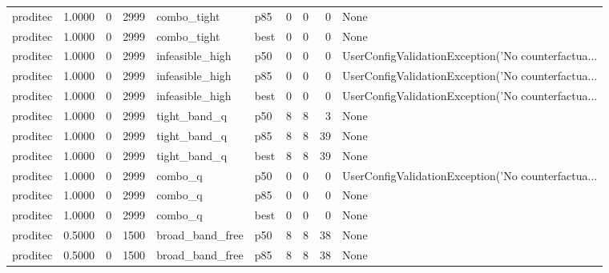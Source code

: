 \begin{tabular}{lrrrllrrrl}
proditec &    1.0000 &    0 &   2999 &          combo\_tight &    p85 &               0 &          0 &       0 &                                               None \\
proditec &    1.0000 &    0 &   2999 &          combo\_tight &   best &               0 &          0 &       0 &                                               None \\
proditec &    1.0000 &    0 &   2999 &      infeasible\_high &    p50 &               0 &          0 &       0 & UserConfigValidationException('No counterfactua... \\
proditec &    1.0000 &    0 &   2999 &      infeasible\_high &    p85 &               0 &          0 &       0 & UserConfigValidationException('No counterfactua... \\
proditec &    1.0000 &    0 &   2999 &      infeasible\_high &   best &               0 &          0 &       0 & UserConfigValidationException('No counterfactua... \\
proditec &    1.0000 &    0 &   2999 &         tight\_band\_q &    p50 &               8 &          8 &       3 &                                               None \\
proditec &    1.0000 &    0 &   2999 &         tight\_band\_q &    p85 &               8 &          8 &      39 &                                               None \\
proditec &    1.0000 &    0 &   2999 &         tight\_band\_q &   best &               8 &          8 &      39 &                                               None \\
proditec &    1.0000 &    0 &   2999 &              combo\_q &    p50 &               0 &          0 &       0 & UserConfigValidationException('No counterfactua... \\
proditec &    1.0000 &    0 &   2999 &              combo\_q &    p85 &               0 &          0 &       0 &                                               None \\
proditec &    1.0000 &    0 &   2999 &              combo\_q &   best &               0 &          0 &       0 &                                               None \\
proditec &    0.5000 &    0 &   1500 &      broad\_band\_free &    p50 &               8 &          8 &      38 &                                               None \\
proditec &    0.5000 &    0 &   1500 &      broad\_band\_free &    p85 &               8 &          8 &      38 &                                               None \\

\end{tabular}
